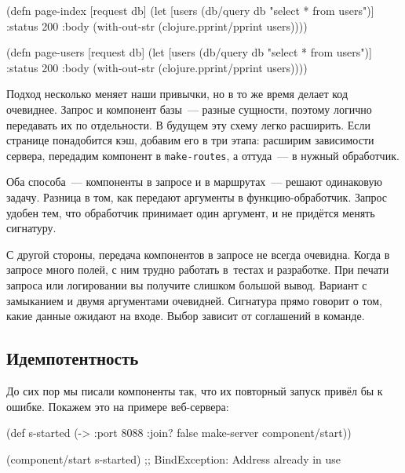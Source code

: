 \ifnarrow

\begin{english}
  \begin{clojure}
(defn page-index
  [request db]
  (let [users (db/query db
                "select * from users")]
    {:status 200
     :body (with-out-str
             (clojure.pprint/pprint
               users))}))
  \end{clojure}
\end{english}

\else

\begin{english}
  \begin{clojure}
(defn page-users
  [request db]
  (let [users (db/query db "select * from users")]
    {:status 200
     :body (with-out-str
             (clojure.pprint/pprint users))}))
  \end{clojure}
\end{english}

\fi

Подход несколько меняет наши привычки, но в то же время делает код
очевиднее. Запрос и компонент базы~--- разные сущности, поэтому логично
передавать их по отдельности. В будущем эту схему легко расширить. Если странице
понадобится кэш, добавим его в три этапа: расширим зависимости сервера,
передадим компонент в \verb|make-routes|, а оттуда~--- в нужный обработчик.

Оба способа~--- компоненты в запросе и в маршрутах~--- решают одинаковую
задачу. Разница в том, как передают аргументы в функцию-обработчик. Запрос
удобен тем, что обработчик принимает один аргумент, и не придётся менять
сигнатуру.

С другой стороны, передача компонентов в запросе не всегда очевидна. Когда в
запросе много полей, с ним трудно работать в~тестах и разработке. При печати
запроса или логировании вы получите слишком большой вывод. Вариант с замыканием
и двумя аргументами очевидней. Сигнатура прямо говорит о том, какие данные
ожидают на входе. Выбор зависит от соглашений в команде.

\subsection{Идемпотентность}

До сих пор мы писали компоненты так, что их повторный запуск привёл бы к
ошибке. Покажем это на примере веб-сервера:

\ifnarrow

\begin{english}
  \begin{clojure}
(def s-started
  (-> {:port 8088 :join? false}
      make-server
      component/start))

(component/start s-started)
;; BindException: Address already in use
  \end{clojure}
\end{english}

